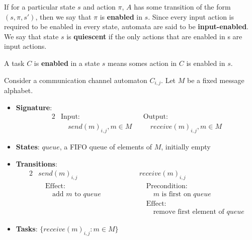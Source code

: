 \documentclass[11pt]{article}
\begin{document}
If for a particular state \(s\) and action \(\pi\), \(A\) has some transition of the form
\((s,\pi,s')\), then we say that \(\pi\) is \textbf{enabled} in \(s\). Since every input action is required to
be enabled in every state, automata are said to be \textbf{input-enabled}. We say that state \(s\) is \textbf{quiescent}
if the only actions that are enabled in s are input actions.

A task \(C\) is \textbf{enabled} in a state \(s\) means somes action in \(C\) is enabled in \(s\).

\begin{examplle}
\label{8.1.1}
Consider a communication channel automaton \(C_{i,j}\). Let \(M\) be a fixed message alphabet.
\begin{itemize}
\item \textbf{Signature}:
\begin{alignat*}{2}
&\text{Input}:\hspace{3cm}&&\text{Output:}\\
&\quad send(m)_{i,j},m\in M&&\quad receive(m)_{i,j},m\in M
\end{alignat*}
\item \textbf{States}: \(queue\), a FIFO queue of elements of \(M\), initially empty
\item \textbf{Transitions}:
\begin{alignat*}{2}
&send(m)_{i,j}\hspace{3cm}&&receive(m)_{i,j}\\
&\quad\text{Effect:}&&\quad\text{Precondition:}\\
&\quad\quad\text{add }m\text{ to }queue&&\quad\quad m\text{ is first on }queue\\
&&&\quad\text{Effect:}\\
&&&\quad\quad\text{remove first element of }queue
\end{alignat*}
\item \textbf{Tasks}: \(\{receive(m)_{i,j}:m\in M\}\)
\end{itemize}
\end{examplle}
\end{document}

